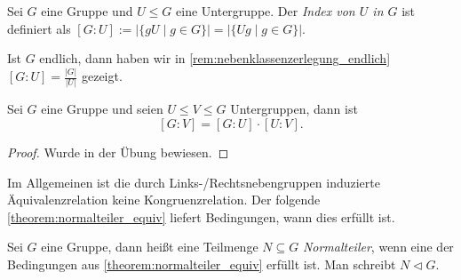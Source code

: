 \begin{definition}
    Sei $G$ eine Gruppe und $U \le G$ eine Untergruppe. Der \emph{Index von $U$ in $G$} ist definiert als $[G:U] := \vert \{gU \mid g \in G\}\vert = \vert \{Ug \mid g \in G\}\vert$. 
\end{definition}

\begin{remark}
    Ist $G$ endlich, dann haben wir in \cref{rem:nebenklassenzerlegung_endlich} $[G:U] = \frac{\vert G \vert}{\vert U \vert}$ gezeigt.
\end{remark}

\begin{theorem}[Indexsatz]
    Sei $G$ eine Gruppe und seien $U \le V \le G$ Untergruppen, dann ist $$[G:V] = [G:U] \cdot [U:V].$$ 
\end{theorem}
\begin{proof}
    Wurde in der Übung bewiesen.
\end{proof}

Im Allgemeinen ist die durch Links-/Rechtsnebengruppen induzierte Äquivalenzrelation keine Kongruenzrelation. Der folgende \cref{theorem:normalteiler_equiv} liefert Bedingungen, wann dies erfüllt ist.

\begin{definition}
    Sei $G$ eine Gruppe, dann heißt eine Teilmenge $N \subseteq G$ \emph{Normalteiler}, wenn eine der Bedingungen aus \cref{theorem:normalteiler_equiv} erfüllt ist. Man schreibt $N\vartriangleleft G$.
\end{definition}

